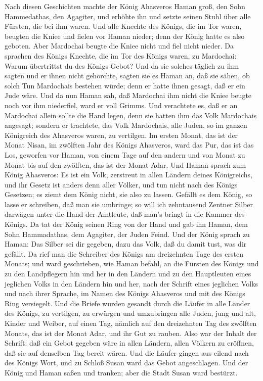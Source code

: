  Nach diesen Geschichten machte der König Ahasveros Haman
groß, den Sohn Hammedathas, den Agagiter, und erhöhte ihn und setzte
seinen Stuhl über alle Fürsten, die bei ihm waren.  Und alle
Knechte des Königs, die im Tor waren, beugten die Kniee und fielen vor
Haman nieder; denn der König hatte es also geboten. Aber Mardochai
beugte die Kniee nicht und fiel nicht nieder.  Da sprachen
des Königs Knechte, die im Tor des Königs waren, zu Mardochai: Warum
übertrittst du des Königs Gebot?  Und da sie solches täglich
zu ihm sagten und er ihnen nicht gehorchte, sagten sie es Haman an, daß
sie sähen, ob solch Tun Mardochais bestehen würde; denn er hatte ihnen
gesagt, daß er ein Jude wäre.  Und da nun Haman sah, daß
Mardochai ihm nicht die Kniee beugte noch vor ihm niederfiel, ward er
voll Grimms.  Und verachtete es, daß er an Mardochai allein
sollte die Hand legen, denn sie hatten ihm das Volk Mardochais angesagt;
sondern er trachtete, das Volk Mardochais, alle Juden, so im ganzen
Königreich des Ahasveros waren, zu vertilgen.  Im ersten
Monat, das ist der Monat Nisan, im zwölften Jahr des Königs Ahasveros,
ward das Pur, das ist das Los, geworfen vor Haman, von einem Tage auf
den andern und von Monat zu Monat bis auf den zwölften, das ist der
Monat Adar.  Und Haman sprach zum König Ahasveros: Es ist
ein Volk, zerstreut in allen Ländern deines Königreichs, und ihr Gesetz
ist anders denn aller Völker, und tun nicht nach des Königs Gesetzen; es
ziemt dem König nicht, sie also zu lassen.  Gefällt es dem
König, so lasse er schreiben, daß man sie umbringe; so will ich
zehntausend Zentner Silber darwägen unter die Hand der Amtleute, daß
man's bringt in die Kammer des Königs.  Da tat der König
seinen Ring von der Hand und gab ihn Haman, dem Sohn Hammadathas, dem
Agagiter, der Juden Feind.  Und der König sprach zu Haman:
Das Silber sei dir gegeben, dazu das Volk, daß du damit tust, was dir
gefällt.  Da rief man die Schreiber des Königs am
dreizehnten Tage des ersten Monats; und ward geschrieben, wie Haman
befahl, an die Fürsten des Königs und zu den Landpflegern hin und her in
den Ländern und zu den Hauptleuten eines jeglichen Volks in den Ländern
hin und her, nach der Schrift eines jeglichen Volks und nach ihrer
Sprache, im Namen des Königs Ahasveros und mit des Königs Ring
versiegelt.  Und die Briefe wurden gesandt durch die Läufer
in alle Länder des Königs, zu vertilgen, zu erwürgen und umzubringen
alle Juden, jung und alt, Kinder und Weiber, auf einen Tag, nämlich auf
den dreizehnten Tag des zwölften Monats, das ist der Monat Adar, und ihr
Gut zu rauben.  Also war der Inhalt der Schrift: daß ein
Gebot gegeben wäre in allen Ländern, allen Völkern zu eröffnen, daß sie
auf denselben Tag bereit wären.  Und die Läufer gingen aus
eilend nach des Königs Wort, und zu Schloß Susan ward das Gebot
angeschlagen. Und der König und Haman saßen und tranken; aber die Stadt
Susan ward bestürzt.

